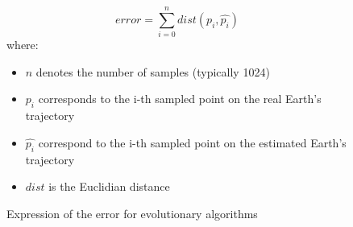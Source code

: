 \begin{figure}
    \[ error = \sum_{i=0}^{n} dist(p_{i}, \hat{p_{i}}) \]
    where:
    \begin{itemize}
        \item \(n\) denotes the number of samples (typically 1024)
        \item \(p_{i}\) corresponds to the i-th sampled point on the real
              Earth's
              trajectory
        \item \(\hat{p_{i}}\) correspond to the i-th sampled point on the
              estimated
              Earth's trajectory
        \item \(dist\) is the Euclidian distance
    \end{itemize}
    \caption{Expression of the error for evolutionary algorithms}
    \label{error}
\end{figure}


